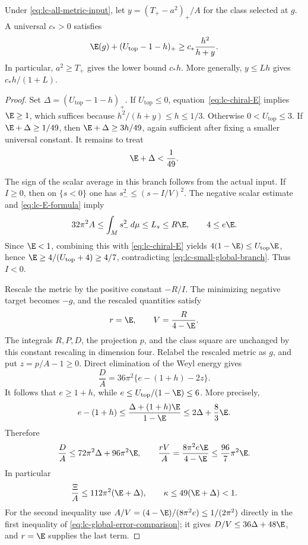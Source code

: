 \begin{theorem}\label{thm:lc-E-window}
Under \eqref{eq:lc-all-metric-input}, let
$y=(T_+-a^2)_+/A$ for the class selected at $g$.  A universal $c_*>0$
satisfies
\begin{equation}\label{eq:lc-E-shortfall-window}
 \E(g)+(U_{\mathrm{top}}-1-h)_+
       \ge c_*\frac{h^2}{h+y}.
\end{equation}
In particular, $a^2\ge T_+$ gives the lower bound $c_*h$.
More generally, $y\le Lh$ gives $c_*h/(1+L)$.
\end{theorem}

\begin{proof}
Set $\Delta=(U_{\mathrm{top}}-1-h)_+$.  If
$U_{\mathrm{top}}\le0$, equation~\eqref{eq:lc-chiral-E} implies
$\E\ge1$, which suffices because $h^2/(h+y)\le h\le1/3$.
Otherwise $0<U_{\mathrm{top}}\le3$.  If $\E+\Delta\ge1/49$,
then $\E+\Delta\ge3h/49$, again sufficient after fixing a smaller
universal constant.  It remains to treat
\begin{equation}\label{eq:lc-small-global-branch}
 \E+\Delta<\frac1{49}.
\end{equation}

The sign of the scalar average in this branch follows from the actual
input.  If $I\ge0$, then on $\{s<0\}$ one has
$s_-^2\le(s-I/V)^2$.  The negative scalar estimate and
\eqref{eq:lc-E-formula} imply
\[
 32\pi^2A\le\int_Ms_-^2\,d\mu\le L_s\le R\E,
 \qquad 4\le e\E.
\]
Since $\E<1$, combining this with \eqref{eq:lc-chiral-E} yields
$4(1-\E)\le U_{\mathrm{top}}\E$, hence
$\E\ge4/(U_{\mathrm{top}}+4)\ge4/7$, contradicting
\eqref{eq:lc-small-global-branch}.  Thus $I<0$.

Rescale the metric by the positive constant $-R/I$.  The minimizing
negative target becomes $-g$, and the rescaled quantities satisfy
\begin{equation}\label{eq:lc-optimal-rescaling}
 r=\E,\qquad V=\frac{R}{4-\E}.
\end{equation}
The integrals $R,P,D$, the projection $p$, and the class square are
unchanged by this constant rescaling in dimension four.  Relabel the
rescaled metric as $g$, and put $z=p/A-1\ge0$.  Direct elimination
of the Weyl energy gives
\begin{equation}\label{eq:lc-D-energy}
 \frac DA=36\pi^2\{e-(1+h)-2z\}.
\end{equation}
It follows that $e\ge1+h$, while
$e\le U_{\mathrm{top}}/(1-\E)\le6$.  More precisely,
\[
 e-(1+h)\le\frac{\Delta+(1+h)\E}{1-\E}
               \le2\Delta+\frac83\E.
\]
Therefore
\begin{equation}\label{eq:lc-global-error-comparison}
 \frac DA\le72\pi^2\Delta+96\pi^2\E,
 \qquad
 \frac{rV}{A}=\frac{8\pi^2e\E}{4-\E}
                     \le\frac{96}{7}\pi^2\E.
\end{equation}
In particular
\begin{equation}\label{eq:lc-Xi-global}
 \frac\Xi A\le112\pi^2(\E+\Delta),\qquad
 \kappa\le49(\E+\Delta)<1.
\end{equation}
For the second inequality use
$A/V=(4-\E)/(8\pi^2e)\le1/(2\pi^2)$ directly in the first
inequality of \eqref{eq:lc-global-error-comparison}; it gives
$D/V\le36\Delta+48\E$, and $r=\E$ supplies the last term.


\end{proof}
